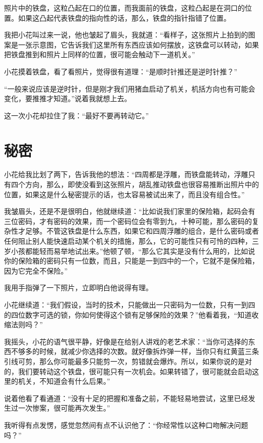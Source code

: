 照片中的铁盘，这粒凸起在口的位置，而我面前的铁盘，这粒凸起是在洞口的位置。如果这凸起代表铁盘的指向性的话，那么，铁盘的指针指错了位置。

我把小花叫过来一说，他也皱起了眉头，我就道：“看样子，这张照片上拍到的图案是一张示意图，它告诉我们这里所有东西应该如何摆放，这铁盘可以转动，如果把铁盘推到和照片上同样的位置，很可能会触动下一道机关。”

小花摸着铁盘，看了看照片，觉得很有道理：“是顺时针推还是逆时针推？”

“一般来说应该是逆时针，但是刚才我们用猪血启动了机关，机括方向也有可能会变化，要推推才知道。”说着我就想上去。

这一次小花却拉住了我：“最好不要再转动它。”

\chapter{秘密}

小花给我比划了两下，告诉我他的想法：“四周都是浮雕，而铁盘能转动，浮雕只有四个方向，那么，即使没看到这张照片，胡乱推动铁盘也很容易推断出照片中的位置，如果这是什么秘密提示的话，也太容易被试出来了，而且没有组合性。”

我皱眉头，还是不是很明白，他就继续道：“比如说我们家里的保险箱，起码会有三位密码，才有密码的效果，而一个密码位会有零到九，十种可能，那么密码的复杂性才足够。不管这铁盘是什么东西，如果它和四周浮雕的组合，是什么密码或者任何阻止别人能快速启动某个机关的措施，那么，它的可能性只有可怜的四种，三岁小孩都能轻而易举地试出来。”他顿了顿，“那么它其实是没有什么用的，比如说你的保险箱的密码只有一位数，而且，只能是一到四中的一个，它就不是保险箱，因为它完全不保险。”

我用手指弹了一下照片，立即明白他说得有理。

小花继续道：“我们假设，当时的技术，只能做出一只密码为一位数，只有一到四的四位数字可选的锁，你如何使得这个锁有足够保险的效果？”他看着我，“知道收缩法则吗？”

我摇头，小花的语气很平静，好像是在给别人讲戏的老艺术家：“当你可选择的东西不够多的时候，就减少你选择的次数。就好像拆炸弹一样，当你只有红黄蓝三条引线可剪，那么你可能最多只能剪一次，剪错就会爆炸。所以，如果你说的是对的，我们要转动这个铁盘，很可能只有一次机会。如果转错了，很可能就会启动这里的机关，不知道会有什么后果。”

说着他看了看通道：“没有十足的把握和准备之前，不能轻易地尝试，这里已经发生过一次惨案，很可能再次发生。”

我听得有点发愣，感觉忽然间有点不认识他了：“你经常性以这种口吻解决问题吗？”

